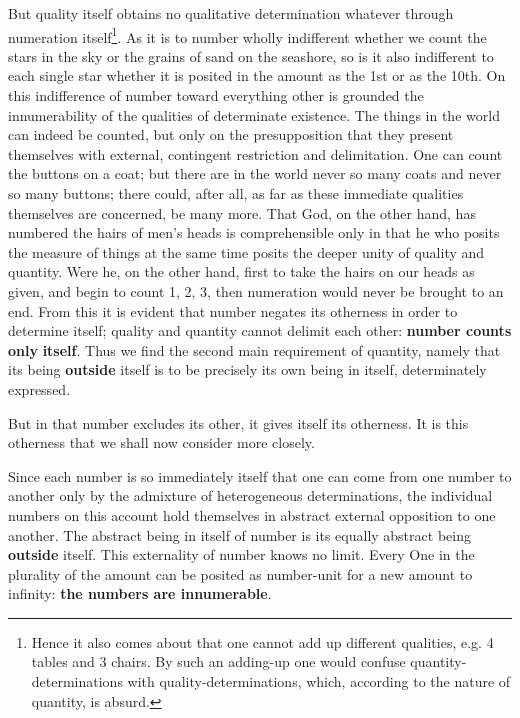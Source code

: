 \documentclass[12pt,a4paper,openany]{book}
\newcommand{\opage}[1]{\marginnote{\footnotesize\textit{[#1]}}}
\begin{document}
But quality itself obtains no qualitative
determination whatever through numeration itself\footnote{Hence it also comes about that one cannot add up different qualities, e.g. 4 tables and 3 chairs. By such an adding-up one would confuse quantity-determinations with quality-determinations, which, according to the nature of quantity, is absurd.}. As it is
\setcounter{footnote}{0}%
\opage{36}to number wholly indifferent whether we count the stars in
the sky or the grains of sand on the seashore, so is
it also indifferent to each single star whether
it is posited in the amount as the 1st or as the 10th. On this indifference of number toward everything other is grounded the innumerability of the qualities of determinate existence. The things in the world can indeed be counted, but only on
the presupposition that they present themselves with external,
contingent restriction and delimitation. One can
count the buttons on a coat; but there are in the world never
so many coats and never so many buttons; there
could, after all, as far as these immediate qualities themselves are concerned, be many more. That God, on the other hand, has numbered
the hairs of men's heads is comprehensible only in that
he who posits the measure of things at the same time posits the deeper
unity of quality and quantity. Were he,
on the other hand, first to take the hairs on our heads as given, and begin to count 1, 2, 3, then numeration
would never be brought to an end. From this it is evident that
number negates its otherness in order to determine itself;
quality and quantity cannot delimit each other:
\textbf{number counts only} \textbf{itself}. Thus we find %
the second main requirement of quantity, namely that its
being \textbf{outside} itself is to be precisely its own being in
itself, determinately expressed.

But in that number excludes its other, it gives itself
its otherness. It is this otherness that we shall now
consider more closely.

Since each number is so immediately itself that one
can come from one number to another only by the admixture
of heterogeneous determinations, the
individual numbers on this account hold themselves in abstract external
opposition to one another. The abstract being in
itself of number is its equally abstract being \textbf{outside} itself. This
\setcounter{footnote}{0}%
\opage{37}externality of number knows no limit. Every
One in the plurality of the amount can be posited as number-unit for
a new amount to infinity: \textbf{the numbers are innumerable}.
\end{document}
